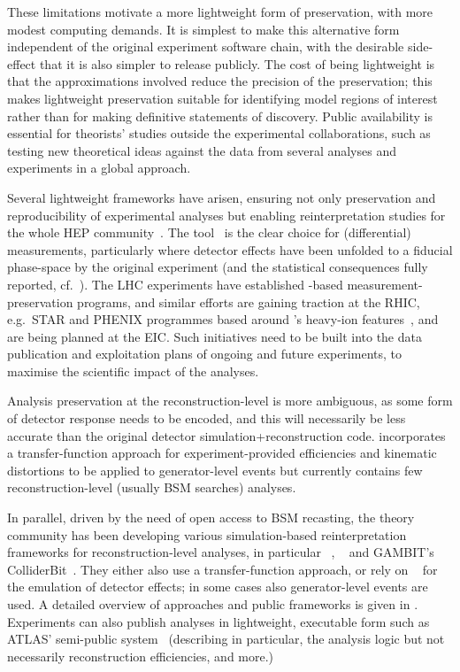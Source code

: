\documentclass[11pt]{article}
\begin{document}
These limitations motivate a more lightweight form of preservation, with more modest computing demands. It is simplest to make this alternative form independent of the original experiment software chain, with the desirable side-effect that it is also simpler to release publicly. The cost of being lightweight is that the approximations involved reduce the precision of the preservation; this makes lightweight preservation suitable for identifying model regions of interest rather than for making definitive statements of discovery. Public availability is essential for theorists' studies outside the experimental collaborations, such as testing new theoretical ideas against the data from several analyses and experiments in a global approach.

Several lightweight frameworks have arisen, ensuring not only preservation and reproducibility of experimental analyses but enabling \gls{reinterpretation} studies for the whole \gls{HEP} community~\cite{LHCReinterpretationForum:2020xtr}. The \rivet tool~\cite{Bierlich:2019rhm} is the clear choice for (differential) measurements, particularly where detector effects have been unfolded to a fiducial phase-space by the original experiment (and the statistical consequences fully reported, cf.~). The \gls{LHC} experiments have established \rivet-based measurement-preservation programs, and similar efforts are gaining traction at the \gls{RHIC}, e.g.~\gls{STAR} and \gls{PHENIX} programmes based around \rivet's heavy-ion features~\cite{Bierlich:2020wms}, and are being planned at the \gls{EIC}. Such initiatives need to be built into the data publication and exploitation plans of ongoing and future experiments, to maximise the scientific impact of the analyses.

Analysis preservation at the reconstruction-level is more ambiguous, as some form of detector response needs to be encoded, and this will necessarily be less accurate than the original detector simulation+reconstruction code.
\rivet incorporates a transfer-function approach for experiment-provided efficiencies and kinematic distortions to be applied to generator-level events but currently contains few reconstruction-level (usually \gls{BSM} searches) analyses.

In parallel, driven by the need of open access to \gls{BSM} recasting, the theory community has been developing various simulation-based reinterpretation frameworks for reconstruction-level analyses, in particular \checkmate~\cite{Drees:2013wra,Dercks:2016npn}, \madanalysis~\cite{Dumont:2014tja,Conte:2018vmg} and GAMBIT's ColliderBit~\cite{GAMBIT:2017qxg}. They either also use a transfer-function approach, or rely on \delphes~\cite{deFavereau:2013fsa} for the emulation of detector effects; in some cases also generator-level events are used. A detailed overview of approaches and public frameworks is given in \cite{LHCReinterpretationForum:2020xtr}.
%
Experiments can also publish analyses in lightweight, executable form such as \gls{ATLAS}' semi-public \simpleanalysis system~\cite{atlas:simpleanalysis}
(describing in particular, the analysis logic but not necessarily reconstruction efficiencies, and more.)
\end{document}
